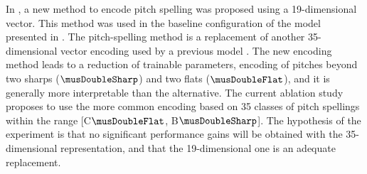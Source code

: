 
In , a new method to encode
pitch spelling was proposed using a 19-dimensional vector.
This method was used in the baseline configuration of the
model presented in . The pitch-spelling
method is a replacement of another 35-dimensional vector
encoding used by a previous model
\parencite{micchi2021deep}. The new encoding method leads to
a reduction of trainable parameters, encoding of pitches
beyond two sharps ($\musDoubleSharp$) and two flats
($\musDoubleFlat$), and it is generally more interpretable
than the alternative. The current ablation study proposes to
use the more common encoding based on 35 classes of pitch
spellings within the range
[C$\musDoubleFlat$, B$\musDoubleSharp$]. The hypothesis of the
experiment is that no significant performance gains will be
obtained with the 35-dimensional representation, and that
the 19-dimensional one is an adequate replacement.
